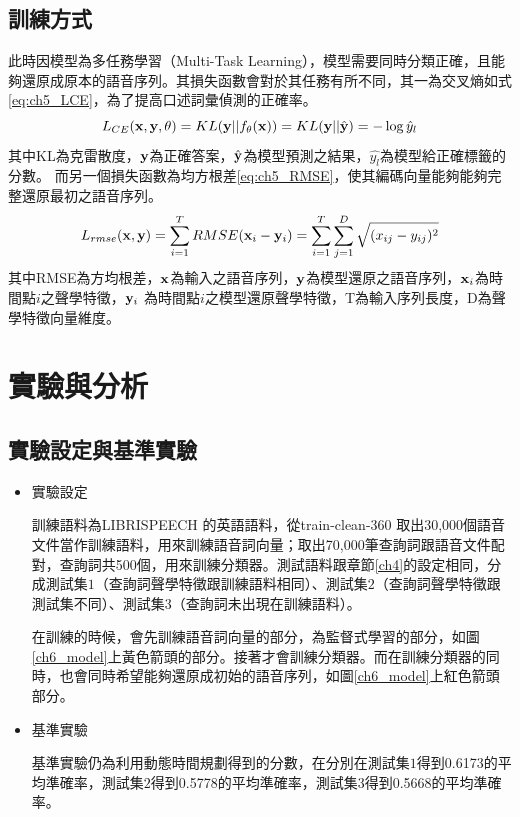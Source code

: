 \subsection{訓練方式}
此時因模型為多任務學習（Multi-Task
Learning），模型需要同時分類正確，且能夠還原成原本的語音序列。其損失函數會對於其任務有所不同，其一為交叉熵如式\ref{eq:ch5_LCE}，為了提高口述詞彙偵測的正確率。
\begin{equation}
\label{eq:ch5_LCE}
L_{CE}(\bold{x} , \bold{y} , \theta) =KL(\bold{y} || f_{\theta}(\bold{x}))= KL( \bold{y} ||\hat{\bold {y}} )  = - \log \hat{y}_{l} 
\end{equation}
其中KL為克雷散度，$\bold{y}$為正確答案，$\hat{\bold{y}}$為模型預測之結果，$\hat{y_l}$為模型給正確標籤的分數。
而另一個損失函數為均方根差\ref{eq:ch5_RMSE}，使其編碼向量能夠能夠完整還原最初之語音序列。
\begin{equation}
\label{eq:ch5_RMSE}
L_{rmse} (\bold{x},\bold{y}) = \sum_{i=1}^{T}
RMSE(\bold{x}_i-\bold{y}_i) = \sum_{i=1}^{T} \sum_{j=1}^D \sqrt{(x_{ij}-y_{ij})^2}
\end{equation}
其中RMSE為方均根差，$\bold{x}$為輸入之語音序列，$\bold{y}$為模型還原之語音序列，$\bold{x}_i$為時間點$i$之聲學特徵，$\bold{y}_i$
為時間點$i$之模型還原聲學特徵，T為輸入序列長度，D為聲學特徵向量維度。
\section{實驗與分析}
\subsection{實驗設定與基準實驗}
\begin{itemize}
\item{實驗設定}

	訓練語料為LIBRISPEECH 的英語語料，從train-clean-360
	取出30,000個語音文件當作訓練語料，用來訓練語音詞向量；取出70,000筆查詢詞跟語音文件配對，查詢詞共500個，用來訓練分類器。測試語料跟章節\ref{ch4}的設定相同，分成測試集$1$（查詢詞聲學特徵跟訓練語料相同）、測試集$2$（查詢詞聲學特徵跟測試集不同）、測試集$3$（查詢詞未出現在訓練語料）。
	
	在訓練的時候，會先訓練語音詞向量的部分，為監督式學習的部分，如圖\ref{ch6_model}上黃色箭頭的部分。接著才會訓練分類器。而在訓練分類器的同時，也會同時希望能夠還原成初始的語音序列，如圖\ref{ch6_model}上紅色箭頭部分。

\vspace{10cm}
\item{基準實驗}

	基準實驗仍為利用動態時間規劃得到的分數，在分別在測試集$1$得到0.6173的平均準確率，測試集$2$得到0.5778的平均準確率，測試集$3$得到0.5668的平均準確率。
\end{itemize}
